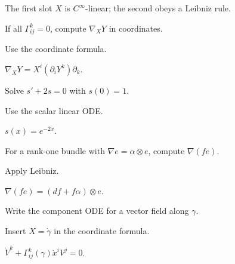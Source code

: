 \begin{solution}
The first slot \(X\) is \(C^\infty\)-linear; the second obeys a Leibniz rule.
\end{solution}

\begin{exercise}\label{exr:vii21-ped-02}
If all \(\Gamma^k_{ij}=0\), compute \(\nabla_XY\) in coordinates.
\end{exercise}

\begin{hint}
Use the coordinate formula.
\end{hint}

\begin{solution}
\(\nabla_XY=X^i(\partial_iY^k)\partial_k\).
\end{solution}

\begin{exercise}\label{exr:vii21-ped-03}
Solve \(s'+2s=0\) with \(s(0)=1\).
\end{exercise}

\begin{hint}
Use the scalar linear ODE.
\end{hint}

\begin{solution}
\(s(x)=e^{-2x}\).
\end{solution}

\begin{exercise}\label{exr:vii21-ped-04}
For a rank-one bundle with \(\nabla e=\alpha\otimes e\), compute \(\nabla(fe)\).
\end{exercise}

\begin{hint}
Apply Leibniz.
\end{hint}

\begin{solution}
\(\nabla(fe)=(df+f\alpha)\otimes e\).
\end{solution}

\begin{exercise}\label{exr:vii21-ped-05}
Write the component ODE for a vector field along \(\gamma\).
\end{exercise}

\begin{hint}
Insert \(X=\dot\gamma\) in the coordinate formula.
\end{hint}

\begin{solution}
\(\dot V^k+\Gamma^k_{ij}(\gamma)\dot x^iV^j=0\).
\end{solution}

